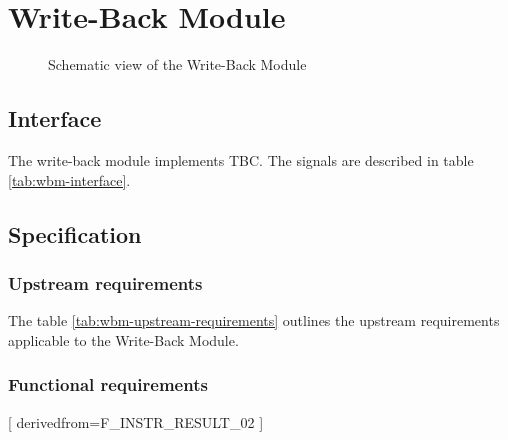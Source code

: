 \section{Write-Back Module}

  \begin{figure}[h!]
      \centering
      
      \caption{Schematic view of the Write-Back Module}
      \label{fig:wbm}
    \end{figure}

  \subsection{Interface}

    \begin{content}
        The write-back module implements TBC. The signals are described in table \ref{tab:wbm-interface}. 
      \end{content}

    

  \subsection{Specification}

    \subsubsection{Upstream requirements}

      The table \ref{tab:wbm-upstream-requirements} outlines the upstream requirements applicable to the Write-Back Module.

      

    \subsubsection{Functional requirements}


      [
          derivedfrom=F\_INSTR\_RESULT\_02
        ]

